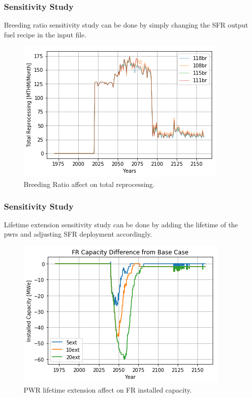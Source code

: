 \begin{frame}
    \frametitle{Sensitivity Study}
    Breeding ratio sensitivity study can be done by simply changing the 
    SFR output fuel recipe in the input file.
    \begin{figure}[htbp!]
        \begin{center}
                \includegraphics[width=.8\textwidth]{./images/sim_output/france/br_tot_rep.png}
        \end{center}
    \caption{Breeding Ratio affect on total reprocessing.}
    \end{figure}
\end{frame}

\begin{frame}
    \frametitle{Sensitivity Study}
    Lifetime extension sensitivity study can be done by adding the
    lifetime of the pwrs and adjusting SFR deployment accordingly.
    \begin{figure}[htbp!]
        \begin{center}
                \includegraphics[width=.8\textwidth]{./images/sim_output/france/fr_diff.png}
        \end{center}
    \caption{PWR lifetime extension affect on FR installed capacity.}
    \end{figure}
\end{frame}




